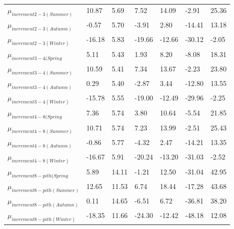 \documentclass{article}\usepackage[]{graphicx}\usepackage[]{color}
\begin{document}
\begin{table}[ht]
\begin{tabular}{|p{}|p{}|p{}|p{}|p{}|p{}|p{}|}
  $\mu_{increment 2-3 (Summer)}$ & 10.87 & 5.69 & 7.52 & 14.09 & -2.91 & 25.36 \\ 
  $\mu_{increment 2-3 (Autumn)}$ & -0.57 & 5.70 & -3.91 & 2.80 & -14.41 & 13.18 \\ 
  $\mu_{increment 2-3 (Winter)}$ & -16.18 & 5.83 & -19.66 & -12.66 & -30.12 & -2.05 \\ 
  $\mu_{increment 3-4 (Spring}$ & 5.11 & 5.43 & 1.93 & 8.20 & -8.08 & 18.31 \\ 
  $\mu_{increment 3-4 (Summer)}$ & 10.59 & 5.41 & 7.34 & 13.67 & -2.23 & 23.80 \\ 
  $\mu_{increment 3-4 (Autumn)}$ & 0.29 & 5.40 & -2.87 & 3.44 & -12.80 & 13.55 \\ 
  $\mu_{increment 3-4 (Winter)}$ & -15.78 & 5.55 & -19.00 & -12.49 & -29.96 & -2.25 \\ 
  $\mu_{increment 4-8 (Spring}$ & 7.36 & 5.74 & 3.80 & 10.64 & -5.54 & 21.85 \\ 
  $\mu_{increment 4-8 (Summer)}$ & 10.71 & 5.74 & 7.23 & 13.99 & -2.51 & 25.43 \\ 
  $\mu_{increment 4-8 (Autumn)}$ & -0.86 & 5.77 & -4.32 & 2.47 & -14.21 & 13.35 \\ 
  $\mu_{increment 4-8 (Winter)}$ & -16.67 & 5.91 & -20.24 & -13.20 & -31.03 & -2.52 \\ 
  $\mu_{increment 8-pith (Spring}$ & 5.89 & 14.11 & -1.21 & 12.50 & -31.04 & 42.95 \\ 
  $\mu_{increment 8-pith (Summer)}$ & 12.65 & 11.53 & 6.74 & 18.44 & -17.28 & 43.68 \\ 
  $\mu_{increment 8-pith (Autumn)}$ & 0.11 & 14.65 & -6.51 & 6.72 & -36.81 & 38.20 \\ 
  $\mu_{increment 8-pith (Winter)}$ & -18.35 & 11.66 & -24.30 & -12.42 & -48.18 & 12.08 \\ 
   \hline
\end{tabular}
\endgroup
\end{table}
\end{document}
